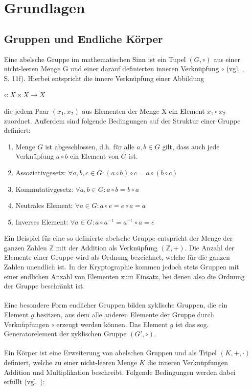 
\chapter{Grundlagen} \label{sec:basics}

\section{Gruppen und Endliche Körper}

Eine abelsche Gruppe im mathematischen Sinn ist ein Tupel $(G,\circ)$ aus einer nicht-leeren Menge G und einer darauf definierten inneren Verknüpfung $\circ$ (vgl. \cite{puttmann}, S. 11f). Hierbei entspricht die innere Verknüpfung einer Abbildung 
\begin{center}
$ \circ: X \times X \to X $
\end{center}
die jedem Paar $(x_1,x_2)$ aus Elementen der Menge X ein Element $x_1 \circ x_2$ zuordnet. Außerdem sind folgende Bedingungen auf der Struktur einer Gruppe definiert: \\

\begin{enumerate}
  \item Menge $G$ ist abgeschlossen, d.h. für alle $a,b \in G$ gilt, dass auch jede Verknüpfung $a \circ b$ ein Element von $G$ ist. 
  \item Assoziativgesetz: $ \forall a,b,c \in G: (a \circ b) \circ c = a \circ (b \circ c) $
  \item Kommutativgesetz: $ \forall a,b \in G: a \circ b = b \circ a $
  \item Neutrales Element: $ \forall a \in G: a \circ e = e \circ a = a$
  \item Inverses Element: $ \forall a \in G: a \circ a^{-1} = a^{-1} \circ a = e$\\
\end{enumerate}

Ein Beispiel für eine so definierte abelsche Gruppe entspricht der Menge der ganzen Zahlen $\mathbb{Z}$ mit der Addition als Verknüpfung $(\mathbb{Z},+)$. Die Anzahl der Elemente einer Gruppe wird als Ordnung bezeichnet, welche für die ganzen Zahlen unendlich ist. In der Kryptographie kommen jedoch stets Gruppen mit einer endlichen Anzahl von Elementen zum Einsatz, bei denen also die Ordnung der Gruppe beschränkt ist. 
\\ \\
Eine besondere Form endlicher Gruppen bilden zyklische Gruppen, die ein Element $g$ besitzen, aus dem alle anderen Elemente der Gruppe durch Verknüpfungen $\circ$ erzeugt werden können. Das Element $g$ ist das sog. Generatorelement der zyklischen Gruppe $(G',\circ)$.
\\ \\
Ein Körper ist eine Erweiterung von abelschen Gruppen und als Tripel $(K,+,\cdot)$ definiert, welche zu einer nicht-leeren Menge $K$ die inneren Verknüpfungen Addition und Multiplikation beschreibt. Folgende Bedingungen werden dabei erfüllt (vgl. \cite{puttmann}): \\

